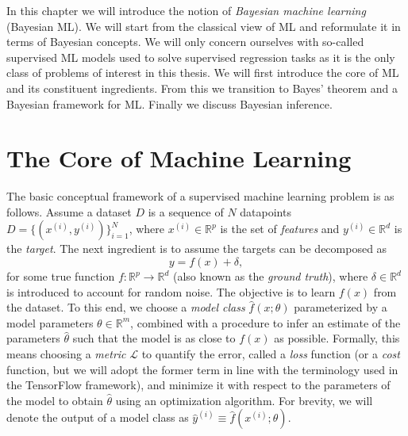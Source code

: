 In this chapter we will introduce the notion of \textit{Bayesian machine learning} (Bayesian ML).
We will start from the classical view of ML
and reformulate it in terms of Bayesian concepts. We will only concern ourselves
with so-called supervised ML models used to solve supervised regression tasks
as it is the only class of problems of interest in this thesis.
We will first introduce the core of ML and its constituent ingredients.
From this we transition to Bayes' theorem and a Bayesian framework for ML.
Finally we discuss Bayesian inference.

\section{The Core of Machine Learning}
The basic conceptual framework of a supervised machine learning problem is as follows. 
Assume a dataset $D$ is a sequence of $N$ datapoints $D = \{(x^{(i)}, y^{(i)})\}_{i=1}^N$,
where $x^{(i)} \in \mathbb{R}^p$ is the set of \textit{features} 
and $y^{(i)} \in \mathbb{R}^d$ is the \textit{target}. 
The next ingredient is to assume the targets can be decomposed as
\begin{equation}\label{eq:model_assumption}
	y = f(x) + \delta,
\end{equation}
for some true function $f : \mathbb{R}^p \to \mathbb{R}^d$ (also known as the \textit{ground truth}), where $\delta \in \mathbb{R}^d$ is introduced to account for random noise. 
The objective is to learn $f(x)$ from the dataset. To this end, we choose a \textit{model class} $\hat{f}(x; \theta)$ 
parameterized by a model parameters $\theta \in \mathbb{R}^m$,
combined with a procedure to infer an estimate of the parameters $\hat{\theta}$ such that the model is as close to $f(x)$ as possible. 
Formally, this means choosing a \textit{metric} $\mathcal{L}$ to quantify the error, called a \textit{loss} function 
(or a \textit{cost} function, but we will adopt the former term in line with the terminology used in the TensorFlow framework), 
and minimize it with respect to the parameters of the model to obtain $\hat{\theta}$ 
using an optimization algorithm. 
For brevity, we will denote the output of a model class as $\hat{y}^{(i)} \equiv \hat{f}(x^{(i)};\theta)$.

\begin{comment}
    \subsection{Model Class and Model Complexity}
    In the last section we used the term model class without any proper definition.
    A model class $\hat{f}(x; \theta)$ is a function parameterized with a parameter $\theta \in \mathbb{R}^d$,
    where $d$ are the dimension of the parameter space. The \textit{model complexity} can loosely be defined as
    how many free parameters there are in the model class, i.e what the number $d$ is.
\end{comment}




